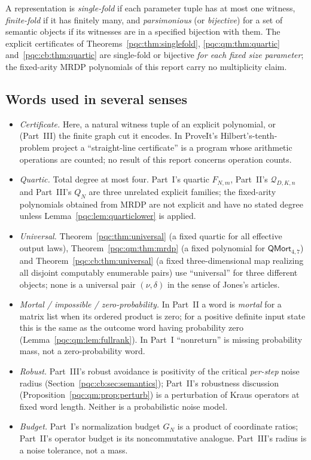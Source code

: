\documentclass[11pt,letterpaper]{article}
\numberwithin{equation}{section}
\theoremstyle{definition}
\theoremstyle{remark}
\newcommand{\QMort}{\mathsf{QMort}}
\newcommand{\cenum}{computably enumerable}
\begin{document}
A representation is \emph{single-fold} if each parameter tuple has at most
one witness, \emph{finite-fold} if it has finitely many, and
\emph{parsimonious} (or \emph{bijective}) for a set of semantic objects if
its witnesses are in a specified bijection with them. The explicit
certificates of Theorems~\ref{pqc:thm:singlefold}, \ref{pqc:qm:thm:quartic}
and~\ref{pqc:cb:thm:quartic} are single-fold or bijective \emph{for each
fixed size parameter}; the fixed-arity MRDP polynomials of this report carry
no multiplicity claim.

\subsection{Words used in several senses}
\begin{itemize}
\item \emph{Certificate.} Here, a natural witness tuple of an explicit
polynomial, or (Part~III) the finite graph cut it encodes. In ProveIt's
Hilbert's-tenth-problem project a ``straight-line certificate'' is a program
whose arithmetic operations are counted; no result of this report concerns
operation counts.
\item \emph{Quartic.} Total degree at most four. Part~I's quartic
$F_{N,m}$, Part~II's $\mathscr Q_{D,K,n}$ and Part~III's $Q_N$ are three
unrelated explicit families; the fixed-arity polynomials obtained from
MRDP are not explicit and have no stated degree unless
Lemma~\ref{pqc:lem:quarticlower} is applied.
\item \emph{Universal.} Theorem~\ref{pqc:thm:universal} (a fixed quartic for
all effective output laws), Theorem~\ref{pqc:qm:thm:mrdp} (a fixed polynomial
for $\QMort_{4,7}$) and Theorem~\ref{pqc:cb:thm:universal} (a fixed
three-dimensional map realizing all disjoint \cenum{} pairs) use
``universal'' for three different objects; none is a universal pair
$(\nu,\delta)$ in the sense of Jones's articles.
\item \emph{Mortal / impossible / zero-probability.} In Part~II a word is
\emph{mortal} for a matrix list when its ordered product is zero; for a
positive definite input state this is the same as the outcome word having
probability zero (Lemma~\ref{pqc:qm:lem:fullrank}). In Part~I
``nonreturn'' is missing probability mass, not a zero-probability word.
\item \emph{Robust.} Part~III's robust avoidance is positivity of the
critical \emph{per-step} noise radius (Section~\ref{pqc:cb:sec:semantics});
Part~II's robustness discussion (Proposition~\ref{pqc:qm:prop:perturb}) is a
perturbation of Kraus operators at fixed word length. Neither is a
probabilistic noise model.
\item \emph{Budget.} Part~I's normalization budget $G_N$ is a product of
coordinate ratios; Part~II's operator budget is its noncommutative analogue.
Part~III's radius is a noise tolerance, not a mass.
\end{itemize}
\end{document}
